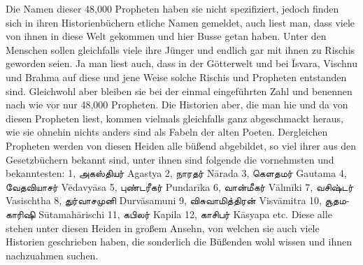 \documentclass{article}
\newcommand{\TamilText}[1]{\texttamil{#1}}
\newcommand{\tam}[1]{\TamilText{#1}}
\begin{document}
Die Namen dieser 48,000 Propheten haben sie nicht spezifiziert, jedoch finden sich in ihren Historienbüchern etliche Namen gemeldet, auch liest man, dass viele von ihnen in diese Welt gekommen und hier Busse getan haben. Unter den Menschen sollen gleichfalls viele ihre Jünger und endlich gar mit ihnen zu Rischis geworden seien. Ja man liest auch, dass in der Götterwelt und bei \={I}svara, Vischnu und Brahma auf diese und jene Weise solche Rischis und Propheten entstanden sind. Gleichwohl aber bleiben sie bei der einmal eingeführten Zahl und benennen nach wie vor nur 48,000 Propheten. Die Historien aber, die man hie und da von diesen Propheten liest, kommen vielmals gleichfalls ganz abgeschmackt heraus, wie sie ohnehin nichts anders sind als Fabeln der alten Poeten. Dergleichen Propheten werden von diesen Heiden alle büßend abgebildet, so viel ihrer aus den Gesetzbüchern bekannt sind, unter ihnen sind folgende die vornehmsten und bekanntesten: 1, \tam{அகஸ்தியர்} Agastya 2, \tam{நாரதர்} N\={a}rada 3, \tam{கெளதமர்} Gautama 4, \tam{வேதவியாசர்} V\={e}davy\={a}sa 5, \tam{புண்டரீகர்} Pundar\={i}ka 6, \tam{வான்மீகர்} V\={a}lm\={i}ki 7, \tam{வசிஷ்டர்} Vasischtha 8, \tam{துர்வாசமுனி} Durv\={a}samuni 9, \tam{விசுவாமித்திரன்} Visv\={a}mitra 10, \tam{சூதமகாரிஷி} S\={u}tamah\={a}rischi 11, \tam{கபிலர்} Kapila 12, \tam{காசிபர்} K\={a}syapa etc. Diese alle stehen unter diesen Heiden in großem Ansehn, von welchen sie auch viele Historien geschrieben haben, die sonderlich die Büßenden wohl wissen und ihnen nachzuahmen suchen.
\end{document}
